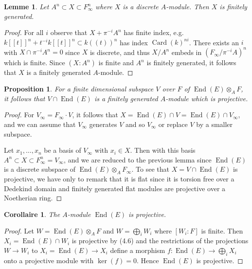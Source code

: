\documentclass[12pt,a4paper]{article}
\theoremstyle{plain}
\newtheorem{lemma}{Lemme}[section]
\newtheorem{proposition}{Proposition}[section]
\newtheorem{corollary}{Corollaire}[section]
\theoremstyle{definition}
\theoremstyle{remark}
\DeclareMathOperator{\End}{End}
\DeclareMathOperator{\Card}{Card}
\begin{document}
\begin{lemma}
Let $A^n \subset X \subset F_\infty^n$ where $X$ is a discrete $A$-module. Then 
$X$ is finitely generated.
\end{lemma}

\begin{proof}
For all $i$ observe that $X + \pi^{-i}A^n$ has finite index, e.g. 
$k[[t]]^n + t^{-i}k[[t]]^n \subset k((t))^n$ has index $\Card(k)^{ni}$. There 
exists an $i$ with $X \cap \pi^{-i}A^n = 0$ since $X$ is discrete, and thus 
$X/A^n$ embeds in $(F_\infty/\pi^{-i}A)^n$ which is finite. Since $(X : A^n)$ 
is finite and $A^n$ is finitely generated, it follows that $X$ is a finitely 
generated $A$-module.
\end{proof}

\begin{proposition}
For a finite dimensional subspace $V$ over $F$ of $\End(E) \otimes_A F$, it 
follows that $V \cap \End(E)$ is a finitely generated $A$-module which is 
projective.
\end{proposition}

\begin{proof}
For $V_\infty = F_\infty \cdot V$, it follows that $X = \End(E) \cap V = \End(E) \cap V_\infty$, and we can assume that $V_\infty$ generates $V$ and so $V_\infty$ or replace $V$ by a smaller subspace.

Let $x_1, \ldots, x_n$ be a basis of $V_\infty$ with $x_i \in X$. Then with this 
basis $A^n \subset X \subset F_\infty^n = V_\infty$, and we are reduced to the 
previous lemma since $\End(E)$ is a discrete subspace of 
$\End(E) \otimes_A F_\infty$. To see that $X = V \cap \End(E)$ is projective, 
we have only to remark that it is flat since it is torsion free over a 
Dedekind domain and finitely generated flat modules are projective over a 
Noetherian ring.
\end{proof}

\begin{corollary}
The $A$-module $\End(E)$ is projective.
\end{corollary}

\begin{proof}
Let $W = \End(E) \otimes_A F$ and $W = \bigoplus_i W_i$ where $[W_i : F]$ is 
finite. Then $X_i = \End(E) \cap W_i$ is projective by (4.6) and the 
restrictions of the projections $W \to W_i$ to $X_i = \End(E) \to X_i$ define 
a morphism $f\colon \End(E) \to \bigoplus_i X_i$ onto a projective module with 
$\ker(f) = 0$. Hence $\End(E)$ is projective.
\end{proof}
\end{document}
